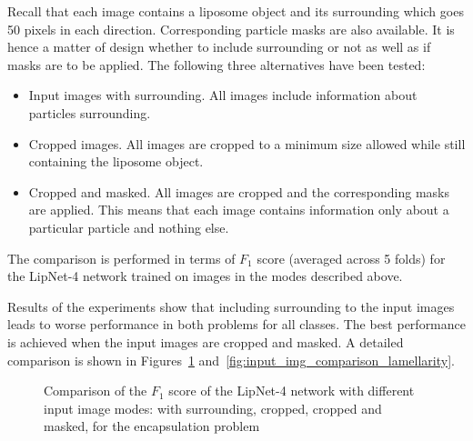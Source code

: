 \documentclass[a4paper, 11pt, table]{article}
\begin{document}
Recall that each image contains a liposome object and its surrounding which goes 50 pixels in each direction. Corresponding particle masks are also available. It is hence a matter of design whether to include surrounding or not  as well as if masks are to be applied. The following three alternatives have been tested:
\begin{itemize}
\item Input images with surrounding. All images include information about particles surrounding.

\item Cropped images. All images are cropped to a minimum size allowed while still containing the liposome object.

\item Cropped and masked. All images are cropped and the corresponding masks are applied. This means that each image contains information only about a particular particle and nothing else.
\end{itemize}

The comparison is performed in terms of $F_1$ score (averaged across 5 folds) for the LipNet-4 network trained on images in the modes described above.

Results of the experiments show that including surrounding to the input images leads to worse performance in both problems for all classes. The best performance is achieved when the input images are cropped and masked. A detailed comparison is shown in Figures~\ref{fig:input_img_comparison_encapsulation} and~\ref{fig:input_img_comparison_lamellarity}.

\begin{figure}[H]
\centering


\caption{\label{fig:input_img_comparison_encapsulation}Comparison of the $F_1$ score of the LipNet-4 network with different input image modes: with surrounding, cropped, cropped and masked, for the encapsulation problem}
\end{figure}
\end{document}

